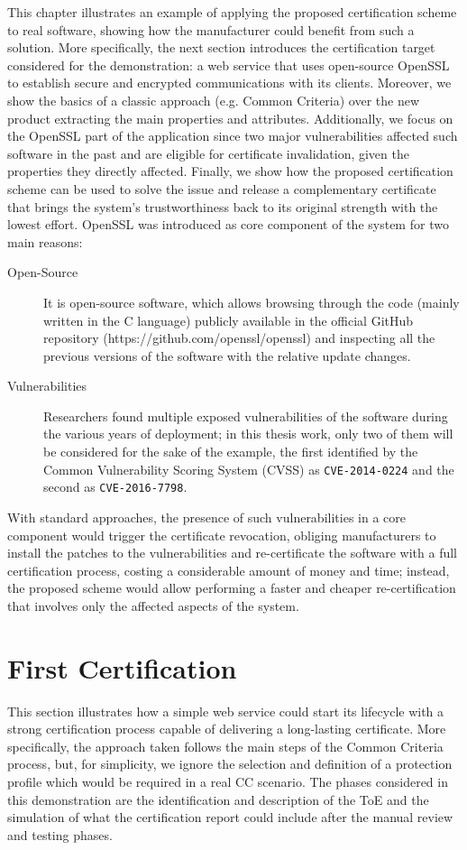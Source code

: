 This chapter illustrates an example of applying the proposed certification scheme to real software, showing how the manufacturer could benefit from such a solution. More specifically, the next section introduces the certification target considered for the demonstration: a web service that uses open-source OpenSSL to establish secure and encrypted communications with its clients. Moreover, we show the basics of a classic approach (e.g. Common Criteria) over the new product extracting the main properties and attributes. Additionally, we focus on the OpenSSL part of the application since two major vulnerabilities affected such software in the past and are eligible for certificate invalidation, given the properties they directly affected. Finally, we show how the proposed certification scheme can be used to solve the issue and release a complementary certificate that brings the system's trustworthiness back to its original strength with the lowest effort. OpenSSL was introduced as core component of the system for two main reasons:
\begin{description}
    \item[Open-Source] It is open-source software, which allows browsing through the code (mainly written in the C language) publicly available in the official GitHub repository (https://github.com/openssl/openssl) and inspecting all the previous versions of the software with the relative update changes.
    \item[Vulnerabilities] Researchers found multiple exposed vulnerabilities of the software during the various years of deployment; in this thesis work, only two of them will be considered for the sake of the example, the first identified by the Common Vulnerability Scoring System (CVSS) as \texttt{CVE-2014-0224} and the second as \texttt{CVE-2016-7798}.
\end{description}

With standard approaches, the presence of such vulnerabilities in a core component would trigger the certificate revocation, obliging manufacturers to install the patches to the vulnerabilities and re-certificate the software with a full certification process, costing a considerable amount of money and time; instead, the proposed scheme would allow performing a faster and cheaper re-certification that involves only the affected aspects of the system.

\section{First Certification}
\label{first}
This section illustrates how a simple web service could start its lifecycle with a strong certification process capable of delivering a long-lasting certificate. More specifically, the approach taken follows the main steps of the Common Criteria process, but, for simplicity, we ignore the selection and definition of a protection profile which would be required in a real CC scenario. The phases considered in this demonstration are the identification and description of the ToE and the simulation of what the certification report could include after the manual review and testing phases.

